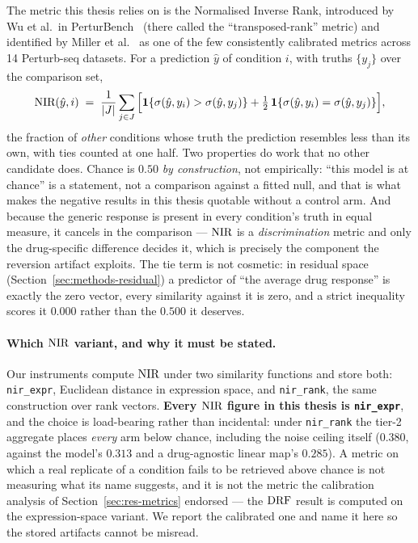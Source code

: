 The metric this thesis relies on is the Normalised Inverse Rank, introduced by Wu et al.\ in
PerturBench~\cite{perturbench} (there called the ``transposed-rank'' metric) and identified by
Miller et al.~\cite{miller} as one of the few consistently calibrated metrics across 14 Perturb-seq
datasets. For a prediction $\hat{y}$ of condition $i$, with truths $\{y_j\}$ over the comparison
set,
\begin{equation}
  \textrm{NIR}(\hat{y}, i) \;=\; \frac{1}{|J|}\sum_{j \in J}
    \Big[\mathbf{1}\{\sigma(\hat{y}, y_i) > \sigma(\hat{y}, y_j)\}
       + \tfrac{1}{2}\,\mathbf{1}\{\sigma(\hat{y}, y_i) = \sigma(\hat{y}, y_j)\}\Big],
\end{equation}
the fraction of \emph{other} conditions whose truth the prediction resembles less than its own,
with ties counted at one half. Two properties do work that no other candidate does. Chance is
$0.50$ \emph{by construction}, not empirically: ``this model is at chance'' is a statement, not a
comparison against a fitted null, and that is what makes the negative results in this thesis
quotable without a control arm. And because the generic response is present in every condition's
truth in equal measure, it cancels in the comparison --- $\textrm{NIR}$ is a \emph{discrimination} metric
and only the drug-specific difference decides it, which is precisely the component the reversion
artifact exploits. The tie term is not cosmetic: in residual space
(Section~\ref{sec:methods-residual}) a predictor of ``the average drug response'' is exactly the
zero vector, every similarity against it is zero, and a strict inequality scores it $0.000$ rather
than the $0.500$ it deserves.

\paragraph{Which $\textrm{NIR}$ variant, and why it must be stated.} Our instruments compute $\textrm{NIR}$ under
two similarity functions and store both: \texttt{nir\_expr}, Euclidean distance in expression space,
and \texttt{nir\_rank}, the same construction over rank vectors. \textbf{Every $\textrm{NIR}$ figure in this
thesis is \texttt{nir\_expr}}, and the choice is load-bearing rather than incidental: under
\texttt{nir\_rank} the tier-2 aggregate places \emph{every} arm below chance, including the noise
ceiling itself ($0.380$, against the model's $0.313$ and a drug-agnostic linear map's $0.285$). A
metric on which a real replicate of a condition fails to be retrieved above chance is not measuring
what its name suggests, and it is not the metric the calibration analysis of
Section~\ref{sec:res-metrics} endorsed --- the $\textrm{DRF}$ result is computed on the expression-space
variant. We report the calibrated one and name it here so the stored artifacts cannot be misread.

